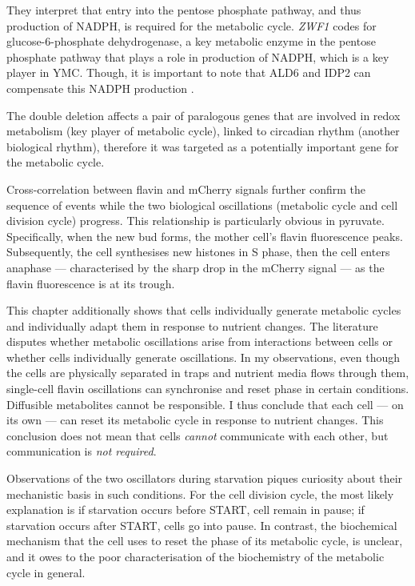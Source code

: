 They interpret that entry into the pentose phosphate pathway, and thus production of NADPH, is required for the metabolic cycle.
\textit{ZWF1} codes for glucose-6-phosphate dehydrogenase, a key metabolic enzyme in the pentose phosphate pathway that plays a role in production of NADPH, which is a key player in YMC.
Though, it is important to note that ALD6 and IDP2 can compensate this NADPH production \parencite{minardSourcesNADPHYeast2005}.

The double deletion affects a pair of paralogous genes that are involved in redox metabolism (key player of metabolic cycle), linked to circadian rhythm (another biological rhythm), therefore it was targeted as a potentially important gene for the metabolic cycle.



Cross-correlation between flavin and mCherry signals further confirm the sequence of events while the two biological oscillations (metabolic cycle and cell division cycle) progress.
This relationship is particularly obvious in pyruvate.
Specifically, when the new bud forms, the mother cell's flavin fluorescence peaks.
Subsequently, the cell synthesises new histones in S phase, then the cell enters anaphase --- characterised by the sharp drop in the mCherry signal --- as the flavin fluorescence is at its trough.

This chapter additionally shows that cells individually generate metabolic cycles and individually adapt them in response to nutrient changes.
The literature disputes whether metabolic oscillations arise from interactions between cells or whether cells individually generate oscillations.
In my observations, even though the cells are physically separated in traps and nutrient media flows through them, single-cell flavin oscillations can synchronise and reset phase in certain conditions.
Diffusible metabolites cannot be responsible.
I thus conclude that each cell --- on its own --- can reset its metabolic cycle in response to nutrient changes.
This conclusion does not mean that cells \emph{cannot} communicate with each other, but communication is \emph{not required}.

Observations of the two oscillators during starvation piques curiosity about their mechanistic basis in such conditions.
For the cell division cycle, the most likely explanation is if starvation occurs before START, cell remain in pause; if starvation occurs after START, cells go into pause.
In contrast, the biochemical mechanism that the cell uses to reset the phase of its metabolic cycle, is unclear, and it owes to the poor characterisation of the biochemistry of the metabolic cycle in general.

